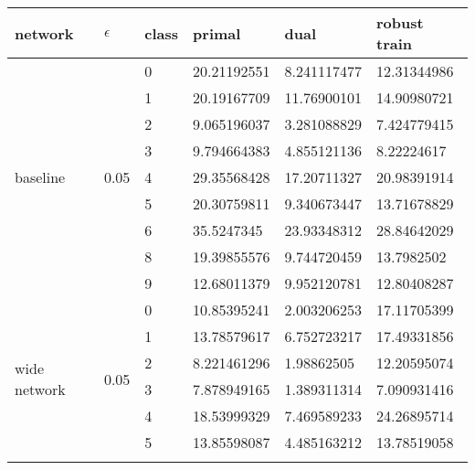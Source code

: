 \documentclass{article}
\begin{document}
\begin{table}[h]
\centering
\begin{tabular}{|l|l|l|l|l|l|}
\hline
network                       & $\epsilon$               & class & primal      & dual        & robust train \\ \hline
\multirow{9}{*}{baseline}     & \multirow{9}{*}{0.05} & 0     & 20.21192551 & 8.241117477 & 12.31344986  \\ \cline{3-6} 
                              &                       & 1     & 20.19167709 & 11.76900101 & 14.90980721  \\ \cline{3-6} 
                              &                       & 2     & 9.065196037 & 3.281088829 & 7.424779415  \\ \cline{3-6} 
                              &                       & 3     & 9.794664383 & 4.855121136 & 8.22224617   \\ \cline{3-6} 
                              &                       & 4     & 29.35568428 & 17.20711327 & 20.98391914  \\ \cline{3-6} 
                              &                       & 5     & 20.30759811 & 9.340673447 & 13.71678829  \\ \cline{3-6} 
                              &                       & 6     & 35.5247345  & 23.93348312 & 28.84642029  \\ \cline{3-6} 
                              &                       & 8     & 19.39855576 & 9.744720459 & 13.7982502   \\ \cline{3-6} 
                              &                       & 9     & 12.68011379 & 9.952120781 & 12.80408287  \\ \hline
\multirow{9}{*}{wide network} & \multirow{9}{*}{0.05} & 0     & 10.85395241 & 2.003206253 & 17.11705399  \\ \cline{3-6} 
                              &                       & 1     & 13.78579617 & 6.752723217 & 17.49331856  \\ \cline{3-6} 
                              &                       & 2     & 8.221461296 & 1.98862505  & 12.20595074  \\ \cline{3-6} 
                              &                       & 3     & 7.878949165 & 1.389311314 & 7.090931416  \\ \cline{3-6} 
                              &                       & 4     & 18.53999329 & 7.469589233 & 24.26895714  \\ \cline{3-6} 
                              &                       & 5     & 13.85598087 & 4.485163212 & 13.78519058  \\ \cline{3-6} 

\end{tabular}
\end{table}
\end{document}
